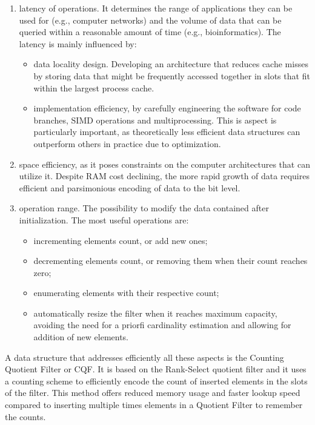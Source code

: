 \begin{enumerate}
	\item latency of \memb operations. It determines the range of applications they can be used for (e.g., computer networks) and the volume of data that can be queried within a reasonable amount of time (e.g., bioinformatics). The latency is mainly influenced by:
	\begin{itemize}
		\item data locality design. Developing an architecture that reduces cache misses by storing data that might be frequently accessed together in slots that fit within the largest process cache.
		\item implementation efficiency, by carefully engineering the software for code branches, SIMD operations and multiprocessing. This is aspect is particularly important, as theoretically less efficient data structures can outperform others in practice due to optimization.
	\end{itemize}
	\item space efficiency, as it poses constraints on the computer architectures that can utilize it. Despite RAM cost declining, the more rapid growth of data requires efficient and parsimonious encoding of data to the bit level.
	\item operation range. The possibility to modify the data contained after initialization. The most useful operations are:
	\begin{itemize}
		\item incrementing elements count, or add new ones; 
		\item decrementing elements count, or removing them when their count reaches zero;
		\item enumerating elements with their respective count;
		\item automatically resize the filter when it reaches maximum capacity, avoiding the need for a priorfi cardinality estimation and allowing for addition of new elements.
	\end{itemize}
\end{enumerate}
A data structure that addresses efficiently all these aspects is the Counting Quotient Filter or CQF. It is based on the Rank-Select quotient filter and it uses a counting scheme to efficiently encode the count of inserted elements in the slots of the filter. This method offers reduced memory usage and faster lookup speed compared to inserting multiple times elements in a Quotient Filter to remember the counts.
